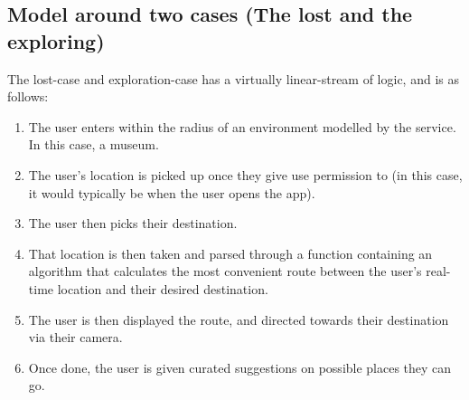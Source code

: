 \subsection*{Model around two cases (The lost and the exploring) }
The lost-case and exploration-case has a virtually linear-stream of logic, and is as follows:
\begin{enumerate}
    \item The user enters within the radius of an environment modelled by the service. In this case, a museum.
    \item The user’s location is picked up once they give use permission to (in this case, it would typically be when the user opens the app). 
    \item The user then picks their destination.
    \item That location is then taken and parsed through a function containing an algorithm that calculates the most convenient route between the user’s real-time location and their desired destination.
    \item The user is then displayed the route, and directed towards their destination via their camera.
    \item Once done, the user is given curated suggestions on possible places they can go.
\end{enumerate}